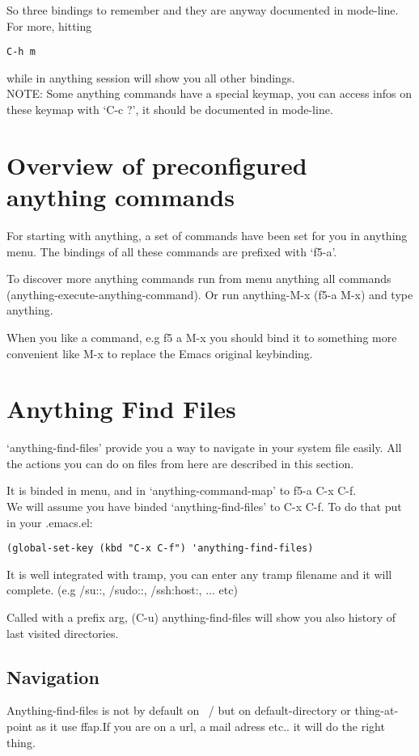 \documentclass[a4paper,11pt]{article}
\begin{document}
So three bindings to remember and they are anyway documented in mode-line.
For more, hitting
\begin{verbatim}
C-h m
\end{verbatim}
while in anything session will show you all other bindings.\\
NOTE: Some anything commands have a special keymap, you can access infos on these keymap with `C-c ?',
it should be documented in mode-line.

\section{Overview of preconfigured anything commands}
\label{sec:overv-comm-avail}
For starting with anything, a set of commands have been set for you in anything menu.
The bindings of all these commands are prefixed with `f5-a'.

To discover more anything commands run from menu anything all commands (anything-execute-anything-command).
Or run anything-M-x (f5-a M-x) and type anything.

When you like a command, e.g f5 a M-x you should bind it to something more convenient like M-x to replace the Emacs
original keybinding.

\section{Anything Find Files}
\label{sec:anything-find-files}
`anything-find-files' provide you a way to navigate in your system file easily.
All the actions you can do on files from here are described in this section.

It is binded in menu, and in `anything-command-map' to f5-a C-x C-f. \\
We will assume you have binded `anything-find-files' to C-x C-f.
To do that put in your .emacs.el:
\begin{verbatim}
(global-set-key (kbd "C-x C-f") 'anything-find-files)
\end{verbatim}
It is well integrated with tramp, you can enter any tramp filename and it will complete.
(e.g /su::, /sudo::, /ssh:host:, ... etc)

Called with a prefix arg, (C-u) anything-find-files will show you also history of last visited directories.

\subsection{Navigation}
\label{sec:navigation}
Anything-find-files is not by default on ~/ but on default-directory or
thing-at-point as it use ffap.If you are on a url, a mail adress
etc.. it will do the right thing.
\end{document}
